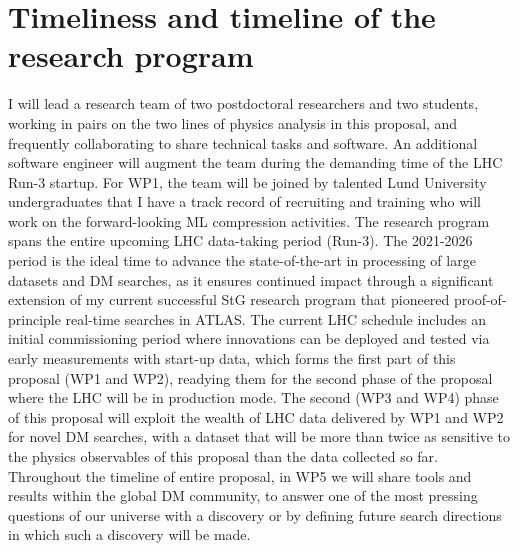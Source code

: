 \documentclass[11pt,a4paper]{article}
\begin{document}
\section{Timeliness and timeline of the research program} 
\smallskip

I will lead a research team of two postdoctoral researchers and two students, working in pairs on the two lines of physics analysis in this proposal, and frequently collaborating to share technical tasks and software. An additional software engineer will augment the team during the demanding time of the LHC Run-3 startup. 
For WP1, the team will be joined by talented Lund University undergraduates that I have a track record of recruiting and training who will work on the forward-looking ML compression activities.
The research program spans the entire upcoming LHC data-taking period (Run-3).
The 2021-2026 period is the ideal time to advance the state-of-the-art in processing of large datasets and DM searches, as it ensures continued impact through a significant extension of my current successful StG research program that pioneered proof-of-principle real-time searches in ATLAS. 
The current LHC schedule includes an initial commissioning period where innovations can be deployed and tested via early measurements with start-up data, which forms the first part of this proposal (WP1 and WP2), readying them for the second phase of the proposal where the LHC will be in production mode.   
The second (WP3 and WP4) phase of this proposal will exploit the wealth of LHC data delivered by WP1 and WP2 for novel DM searches, with a dataset that will be more than \color{red}twice \color{black} as sensitive to the physics observables of this proposal than the data collected so far. 
Throughout the timeline of entire proposal, in WP5 we will share tools and results within the global DM community, to answer one of the most pressing questions of our universe with a discovery or by defining future search directions in which such a discovery will be made. 

\end{document}
